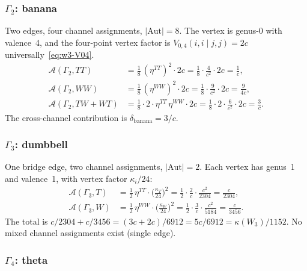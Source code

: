 \documentclass[11pt]{article}
\theoremstyle{plain}
\theoremstyle{definition}
\theoremstyle{remark}
\begin{document}
\subsubsection*{$\Gamma_2$: banana}

Two edges, four channel assignments, $|\mathrm{Aut}| = 8$. The
vertex is genus-0 with valence~4, and the four-point vertex factor
is $V_{0,4}(i,i \mid j,j) = 2c$ universally~\eqref{eq:w3-V04}.
\begin{align}
\mathcal{A}(\Gamma_2, TT) &=
 \tfrac{1}{8}\, (\eta^{TT})^2 \cdot 2c
 = \tfrac{1}{8} \cdot \tfrac{4}{c^2} \cdot 2c
 = \frac{1}{c}, \label{eq:banana-TT}\\
\mathcal{A}(\Gamma_2, WW) &=
 \tfrac{1}{8}\, (\eta^{WW})^2 \cdot 2c
 = \tfrac{1}{8} \cdot \tfrac{9}{c^2} \cdot 2c
 = \frac{9}{4c}, \label{eq:banana-WW}\\
\mathcal{A}(\Gamma_2, TW{+}WT) &=
 \tfrac{1}{8} \cdot 2 \cdot \eta^{TT}\, \eta^{WW} \cdot 2c
 = \tfrac{1}{8} \cdot 2 \cdot \tfrac{6}{c^2} \cdot 2c
 = \frac{3}{c}. \label{eq:banana-mixed}
\end{align}
The cross-channel contribution is $\delta_{\mathrm{banana}} = 3/c$.

\subsubsection*{$\Gamma_3$: dumbbell}

One bridge edge, two channel assignments, $|\mathrm{Aut}| = 2$.
Each vertex has genus~1 and valence~1, with vertex factor
$\kappa_i/24$:
\begin{align}
\mathcal{A}(\Gamma_3, T) &=
 \tfrac{1}{2}\, \eta^{TT} \cdot
 \bigl(\tfrac{\kappa_T}{24}\bigr)^2
 = \tfrac{1}{2} \cdot \tfrac{2}{c} \cdot \tfrac{c^2}{2304}
 = \frac{c}{2304}, \label{eq:dumbbell-T}\\
\mathcal{A}(\Gamma_3, W) &=
 \tfrac{1}{2}\, \eta^{WW} \cdot
 \bigl(\tfrac{\kappa_W}{24}\bigr)^2
 = \tfrac{1}{2} \cdot \tfrac{3}{c} \cdot \tfrac{c^2}{5184}
 = \frac{c}{3456}. \label{eq:dumbbell-W}
\end{align}
The total is $c/2304 + c/3456 = (3c + 2c)/6912 = 5c/6912 =
\kappa(W_3)/1152$. No mixed channel assignments exist (single edge).

\subsubsection*{$\Gamma_4$: theta}
\end{document}
